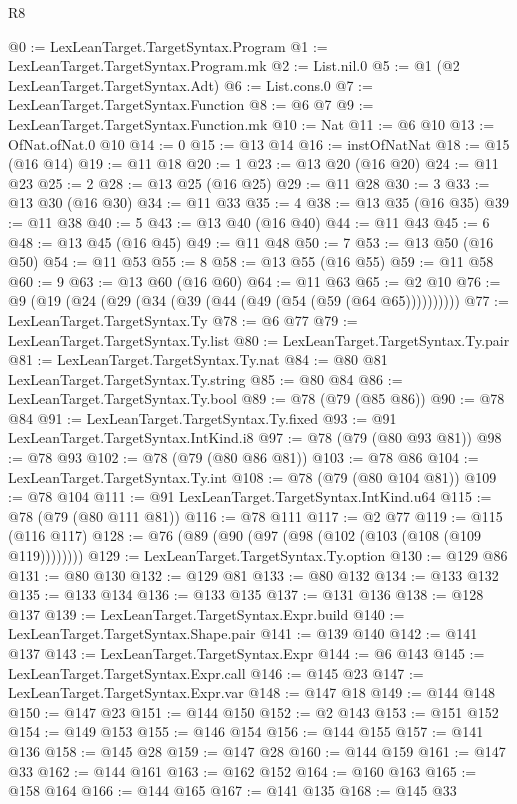 \begin{lexlean}{R8}
\begin{coremodule}
@0 := LexLeanTarget.TargetSyntax.Program
@1 := LexLeanTarget.TargetSyntax.Program.mk
@2 := List.nil.{0}
@5 := @1 (@2 LexLeanTarget.TargetSyntax.Adt)
@6 := List.cons.{0}
@7 := LexLeanTarget.TargetSyntax.Function
@8 := @6 @7
@9 := LexLeanTarget.TargetSyntax.Function.mk
@10 := Nat
@11 := @6 @10
@13 := OfNat.ofNat.{0} @10
@14 := 0
@15 := @13 @14
@16 := instOfNatNat
@18 := @15 (@16 @14)
@19 := @11 @18
@20 := 1
@23 := @13 @20 (@16 @20)
@24 := @11 @23
@25 := 2
@28 := @13 @25 (@16 @25)
@29 := @11 @28
@30 := 3
@33 := @13 @30 (@16 @30)
@34 := @11 @33
@35 := 4
@38 := @13 @35 (@16 @35)
@39 := @11 @38
@40 := 5
@43 := @13 @40 (@16 @40)
@44 := @11 @43
@45 := 6
@48 := @13 @45 (@16 @45)
@49 := @11 @48
@50 := 7
@53 := @13 @50 (@16 @50)
@54 := @11 @53
@55 := 8
@58 := @13 @55 (@16 @55)
@59 := @11 @58
@60 := 9
@63 := @13 @60 (@16 @60)
@64 := @11 @63
@65 := @2 @10
@76 := @9 (@19 (@24 (@29 (@34 (@39 (@44 (@49 (@54 (@59 (@64 @65))))))))))
@77 := LexLeanTarget.TargetSyntax.Ty
@78 := @6 @77
@79 := LexLeanTarget.TargetSyntax.Ty.list
@80 := LexLeanTarget.TargetSyntax.Ty.pair
@81 := LexLeanTarget.TargetSyntax.Ty.nat
@84 := @80 @81 LexLeanTarget.TargetSyntax.Ty.string
@85 := @80 @84
@86 := LexLeanTarget.TargetSyntax.Ty.bool
@89 := @78 (@79 (@85 @86))
@90 := @78 @84
@91 := LexLeanTarget.TargetSyntax.Ty.fixed
@93 := @91 LexLeanTarget.TargetSyntax.IntKind.i8
@97 := @78 (@79 (@80 @93 @81))
@98 := @78 @93
@102 := @78 (@79 (@80 @86 @81))
@103 := @78 @86
@104 := LexLeanTarget.TargetSyntax.Ty.int
@108 := @78 (@79 (@80 @104 @81))
@109 := @78 @104
@111 := @91 LexLeanTarget.TargetSyntax.IntKind.u64
@115 := @78 (@79 (@80 @111 @81))
@116 := @78 @111
@117 := @2 @77
@119 := @115 (@116 @117)
@128 := @76 (@89 (@90 (@97 (@98 (@102 (@103 (@108 (@109 @119))))))))
@129 := LexLeanTarget.TargetSyntax.Ty.option
@130 := @129 @86
@131 := @80 @130
@132 := @129 @81
@133 := @80 @132
@134 := @133 @132
@135 := @133 @134
@136 := @133 @135
@137 := @131 @136
@138 := @128 @137
@139 := LexLeanTarget.TargetSyntax.Expr.build
@140 := LexLeanTarget.TargetSyntax.Shape.pair
@141 := @139 @140
@142 := @141 @137
@143 := LexLeanTarget.TargetSyntax.Expr
@144 := @6 @143
@145 := LexLeanTarget.TargetSyntax.Expr.call
@146 := @145 @23
@147 := LexLeanTarget.TargetSyntax.Expr.var
@148 := @147 @18
@149 := @144 @148
@150 := @147 @23
@151 := @144 @150
@152 := @2 @143
@153 := @151 @152
@154 := @149 @153
@155 := @146 @154
@156 := @144 @155
@157 := @141 @136
@158 := @145 @28
@159 := @147 @28
@160 := @144 @159
@161 := @147 @33
@162 := @144 @161
@163 := @162 @152
@164 := @160 @163
@165 := @158 @164
@166 := @144 @165
@167 := @141 @135
@168 := @145 @33

\end{coremodule}
\end{lexlean}

